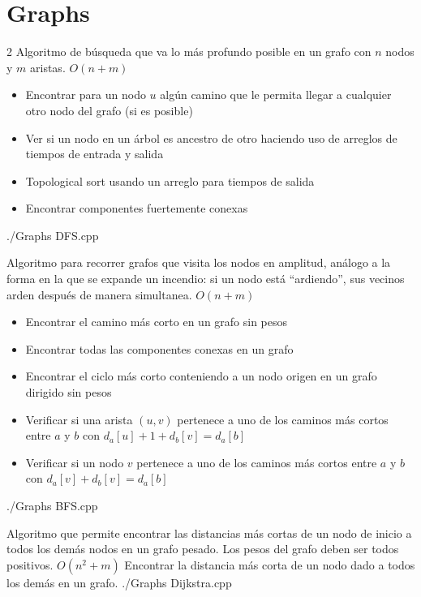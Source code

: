 \section{Graphs}
		\begin{multicols*}{2}
			{Algoritmo de búsqueda que va lo más profundo posible en un grafo con $n$ nodos y $m$ aristas.}
			{$O(n + m)$}
			{\begin{itemize}
				\item Encontrar para un nodo $u$ algún camino que le permita llegar a cualquier otro nodo del grafo (si es posible)
        \item Ver si un nodo en un árbol es ancestro de otro haciendo uso de arreglos de tiempos de entrada y salida 
				\item Topological sort usando un arreglo para tiempos de salida
				\item Encontrar componentes fuertemente conexas
			\end{itemize}}
			{./Graphs}
			{DFS.cpp}
			
			{Algoritmo para recorrer grafos que visita los nodos en amplitud, análogo a la forma en la que se expande un incendio: si un nodo está ``ardiendo'', sus vecinos arden después de manera simultanea.}
			{$O(n + m)$}
			{\begin{itemize}
			  \item Encontrar el camino más corto en un grafo sin pesos 
        \item Encontrar todas las componentes conexas en un grafo 
        \item Encontrar el ciclo más corto conteniendo a un nodo origen en un grafo dirigido sin pesos
        \item Verificar si una arista $(u, v)$ pertenece a uno de los caminos más cortos entre $a$ y $b$ con $d_{a}[u] + 1 + d_{b}[v] = d_{a}[b]$
        \item Verificar si un nodo $v$ pertenece a uno de los caminos más cortos entre $a$ y $b$ con $d_{a}[v] + d_{b}[v] = d_{a}[b]$
			\end{itemize}}
			{./Graphs}
			{BFS.cpp}
			
			{Algoritmo que permite encontrar las distancias más cortas de un nodo de inicio a todos los demás nodos en un grafo pesado. Los pesos del grafo deben ser todos positivos.}
			{$O(n^{2} + m)$}
			{Encontrar la distancia más corta de un nodo dado a todos los demás en un grafo.}
			{./Graphs}
			{Dijkstra.cpp}
			

\end{multicols*}
